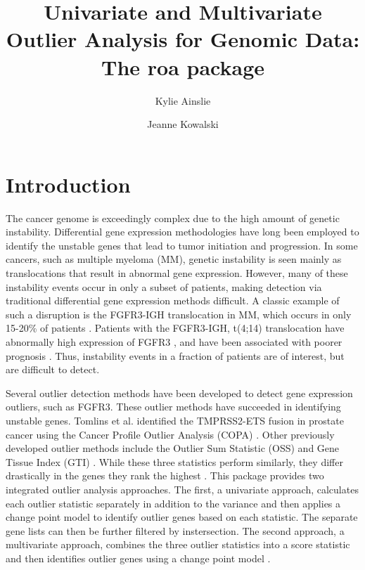 \documentclass[11pt, a4paper]{article}
\begin{document}

\title{Univariate and Multivariate Outlier Analysis for Genomic Data: The \textbf{roa} package}
\author[1,2]{Kylie Ainslie}
\author[1,2]{Jeanne Kowalski} 


\maketitle


\section{Introduction}
The cancer genome is exceedingly complex due to the high amount of genetic instability. Differential gene expression methodologies have long been employed to identify the unstable genes that lead to tumor initiation and progression. In some cancers, such as multiple myeloma (MM), genetic instability is seen mainly as translocations that result in abnormal gene expression. However, many of these instability events occur in only a subset of patients, making detection via traditional differential gene expression methods difficult. A classic example of such a disruption is the FGFR3-IGH translocation in MM, which occurs in only 15-20\% of patients \cite{bergsagel, segges}. Patients with the FGFR3-IGH, t(4;14) translocation have abnormally high expression of FGFR3 \cite{bergsagel, chesi}, and have been associated with poorer prognosis \cite{segges}. Thus, instability events in a fraction of patients are of interest, but are difficult to detect. 

Several outlier detection methods have been developed to detect gene expression outliers, such as FGFR3. These outlier methods have succeeded in identifying unstable genes. Tomlins et al. identified the TMPRSS2-ETS fusion in prostate cancer using the Cancer Profile Outlier Analysis (COPA) \cite{copa}. Other previously developed outlier methods include the Outlier Sum Statistic (OSS) \cite{oss} and Gene Tissue Index (GTI) \cite{gti}. While these three statistics perform similarly, they differ drastically in the genes they rank the highest \cite{gti}. This package provides two integrated outlier analysis approaches. The first, a univariate approach, calculates each outlier statistic separately in addition to the variance and then applies a change point model \cite{cpm} to identify outlier genes based on each statistic. The separate gene lists can then be further filtered by instersection. The second approach, a multivariate approach, combines the three outlier statistics into a score statistic and then identifies outlier genes using a change point model \cite{cpm}.
\end{document}

